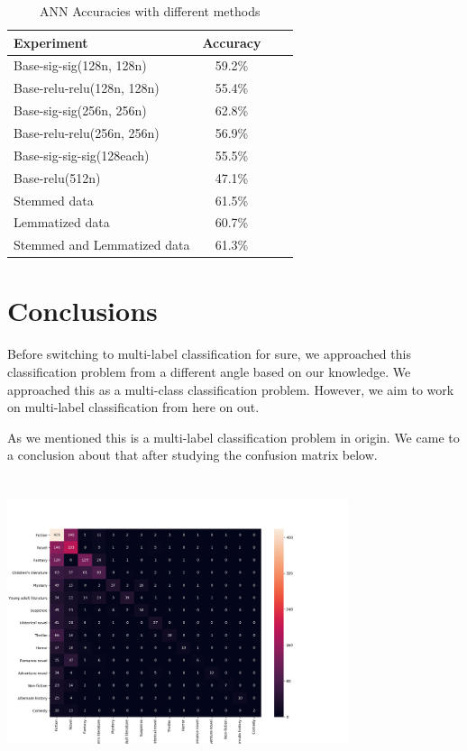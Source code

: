 \documentclass{article}
\begin{document}
\begin{table}[htb]
\caption{ANN Accuracies with different methods}

\vskip 0.15in
\begin{center}
\begin{small}
\begin{sc}
\begin{tabular}{lccr}
\toprule
Experiment & Accuracy \\
\midrule
 Base-sig-sig(128n, 128n)    & 59.2\% \\
 Base-relu-relu(128n, 128n)  & 55.4\% \\
 Base-sig-sig(256n, 256n)    & 62.8\% \\
 Base-relu-relu(256n, 256n)  & 56.9\% \\
 Base-sig-sig-sig(128each)   & 55.5\% \\
 Base-relu(512n)             & 47.1\% \\
 Stemmed data                & 61.5\% \\
 Lemmatized data             & 60.7\% \\
 Stemmed and Lemmatized data & 61.3\% \\
\bottomrule
\end{tabular}
\end{sc}
\end{small}
\end{center}
\vskip -0.15in
\end{table}

\section{Conclusions}
Before switching to multi-label classification for sure, we approached this classification problem from a different angle based on our knowledge. We approached this as a multi-class classification problem. However, we aim to work on multi-label classification from here on out.

As we mentioned this is a multi-label classification problem in origin. We came to a conclusion about that after studying the confusion matrix below.

\includegraphics[width=10cm, height=8.5cm]{conf_matrix}
\end{document}
